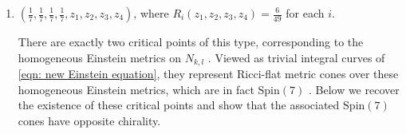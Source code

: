 \documentclass[11pt,letterpaper]{amsart}
\theoremstyle{definition}
\numberwithin{equation}{section}
\newcommand{\spin}{\mathrm{Spin}}
\begin{document}
\begin{enumerate}[I]
These critical points are saddles in the subsystem on $\mathcal{C}_{G_2}$. The smooth $G_2$ metrics that collapse to $\mathbb{CP}^2$ in \cite{bryant_construction_1989, gibbons_einstein_1990} are represented by integral curves that emanate from these points.

\item
$\left(\frac{1}{7},\frac{1}{7},\frac{1}{7},\frac{1}{7},z_1,z_2,z_3,z_4\right)$, where $R_i(z_1,z_2,z_3,z_4)=\frac{6}{49}$ for each $i$.

There are exactly two critical points of this type, corresponding to the homogeneous Einstein metrics on  $N_{k,l}$ \cite{wang_some_1982, castellani1984n, page1984new, kowalski_homogeneous_1993}. Viewed as trivial integral curves of \eqref{eqn: new Einstein equation}, they represent Ricci-flat metric cones over these homogeneous Einstein metrics, which are in fact $\spin(7)$ \cite{bar1993real}. Below we recover the existence of these critical points and show that the associated $\spin(7)$ cones have opposite chirality.
\end{enumerate}
\end{document}
